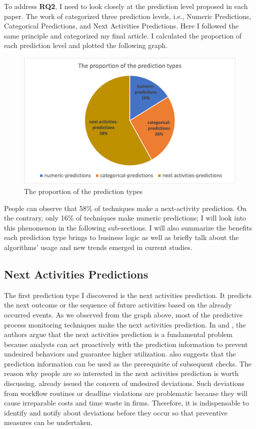 \documentclass[runningheads]{llncs}
\begin{document}
		To address \textbf{RQ2}, I need to look closely at the prediction level proposed in each paper. The work of \cite{original} categorized three prediction levels, i.e., Numeric Predictions,   Categorical Predictions, and Next Activities Predictions. Here I followed the same principle and categorized my final article. I calculated the proportion of each prediction level and plotted the following graph.
		
		
		\begin{figure}
		\includegraphics[scale=0.4]{proportion_prediction.png}
		\centering
		\caption{The proportion of the prediction types}
		\end{figure}
		
		People can observe that 58\% of techniques make a next-activity prediction. On the contrary, only 16\% of techniques make numeric predictions; I will look into this phenomenon in the following sub-sections. I will also summarize the benefits each prediction type brings to business logic as well as briefly talk about the algorithms' usage and new trends emerged in current studies.
		
		\subsection{Next Activities Predictions}
		The first prediction type I discovered is the next activities prediction. It predicts the next outcome or the sequence of future activities based on the already occurred events\cite{original}. As we observed from the graph above, most of the predictive process monitoring techniques make the next activities prediction. In \cite{art-5} and \cite{art-24}, the authors argue that the next activities prediction is a fundamental problem because analysts can act proactively with the prediction information to prevent undesired behaviors and guarantee higher utilization. \cite{art-18} also suggests that the prediction information can be used as the prerequisite of subsequent checks. The reason why people are so interested in the next activities prediction is worth discussing. \cite{art-7} already issued the concern of undesired deviations. Such deviations from workflow routines or deadline violations are problematic because they will cause irreparable costs and time waste in firms. Therefore, it is indispensable to identify and notify about deviations before they occur so that preventive measures can be undertaken. 
		
\end{document}
